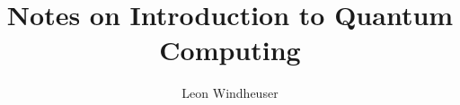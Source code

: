 \documentclass[12pt, a4paper]{article}
\begin{document}
\title{Notes on Introduction to Quantum Computing}
\author{Leon Windheuser}

\maketitle





\end{document}
